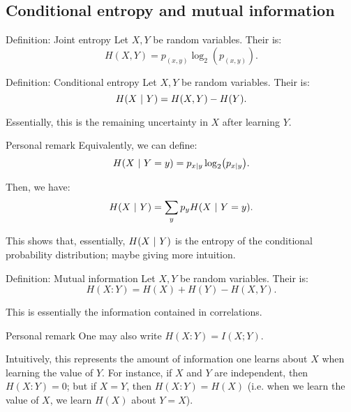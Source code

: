 \documentclass[a4paper]{article}
\begin{document}
\subsection{Conditional entropy and mutual information}

\begin{parag}{Definition: Joint entropy}
    Let $X, Y$ be random variables. Their  is: 
    \[H\left(X, Y\right) = p_{\left(x, y\right)} \log_{2}\left(p_{\left(x, y\right)}\right).\]
\end{parag}

\begin{parag}{Definition: Conditional entropy}
    Let $X, Y$ be random variables. Their  is: 
    \[H\left(X \suchthat Y\right) = H\left(X, Y\right) - H\left(Y\right).\]

    Essentially, this is the remaining uncertainty in $X$ after learning $Y$.

    \begin{subparag}{Personal remark}
        Equivalently, we can define: 
        \[H\left(X \suchthat Y = y\right) = p_{x | y} \log_{2}\left(p_{x|y }\right).\]
        
        Then, we have: 
        \[H\left(X \suchthat Y\right) = \sum_{y} p_y H\left(X \suchthat Y = y\right).\]

        This shows that, essentially, $H\left(X \suchthat Y\right)$ is the entropy of the conditional probability distribution; maybe giving more intuition.
    \end{subparag}
\end{parag}

\begin{parag}{Definition: Mutual information}
    Let $X, Y$ be random variables. Their  is: 
    \[H\left(X : Y\right) = H\left(X\right) + H\left(Y\right) - H\left(X, Y\right).\]

    This is essentially the information contained in correlations.

    \begin{subparag}{Personal remark}
        One may also write $H\left(X: Y\right) = I\left(X; Y\right)$.

        Intuitively, this represents the amount of information one learns about $X$ when learning the value of $Y$. For instance, if $X$ and $Y$ are independent, then $H\left(X: Y\right) = 0$; but if $X = Y$, then $H\left(X: Y\right) = H\left(X\right)$ (i.e. when we learn the value of $X$, we learn $H\left(X\right)$ about $Y = X$).
    \end{subparag}
\end{parag}
\end{document}
